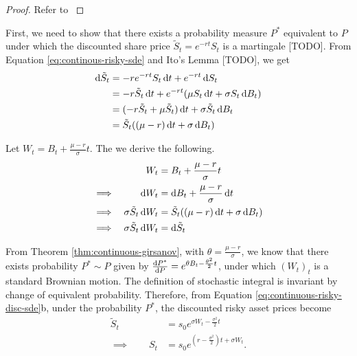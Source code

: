 \begin{proof}
	Refer to \cite[Theorem 4.2.2 and Chapter 4: Exercise 19]{Lamberton1996}
\end{proof}


First, we need to show that there exists a probability measure $ P^* $ equivalent to $ P $ under which the discounted share price $ \tilde{S}_t = e^{-rt} S_t $ is a martingale [TODO]. From Equation \ref{eq:continous-risky-sde} and Ito's Lemma [TODO], we get
\begin{align*}
	\dif \tilde{S}_t  &=  -r e^{-rt} S_t \dif t + e^{-rt} \dif S_t  \\
	&=  -r \tilde{S}_t \dif t + e^{-rt} ( \mu S_t \dif t + \sigma S_t \dif B_t )  \\
	&=  (-r \tilde{S}_t + \mu \tilde{S}_t) \dif t + \sigma \tilde{S}_t \dif B_t  \\
	&=  \tilde{S}_t ( (\mu - r) \dif t + \sigma \dif B_t )
\end{align*}

Let $ W_t = B_t + \frac{\mu - r}{\sigma} t $. The we derive the following.
\begin{subequations}
	\label{eq:continuous-risky-disc-sde}
	\begin{align}
		&&  W_t  &=  B_t + \frac{\mu - r}{\sigma} t  \\
		\implies  &&  \dif W_t  &=  \dif B_t + \frac{\mu - r}{\sigma} \dif t  \nonumber \\
		\implies  &&  \sigma \tilde{S}_t \dif W_t  &=  \tilde{S}_t ( (\mu - r) \dif t + \sigma \dif B_t )  \nonumber \\
		\implies  &&  \sigma \tilde{S}_t \dif W_t  &=  \dif \tilde{S}_t
	\end{align}
\end{subequations}

From Theorem \ref{thm:continuous-girsanov}, with $ \theta = \frac{\mu - r}{\sigma} $, we know that there exists probability $ P^* \sim P $ given by $ \frac{\dif P^*}{\dif P} = e^{ \theta B_t - \frac{\theta^2}{2} t } $,
under which $ (W_t)_t $ is a standard Brownian motion. The definition of stochastic integral is invariant by change of equivalent probability. Therefore, from Equation \ref{eq:continuous-risky-disc-sde}b, under the probability $ P^* $, the discounted risky asset prices become
\begin{subequations}
	\begin{align}
		\label{eq:continous-risky}
		\tilde{S}_t  &=  s_0 e^{\sigma W_t - \frac{\sigma^2}{2} t }  \\
		\implies  \qquad  S_t  &=  s_0 e^{ ( r - \frac{\sigma^2}{2} ) t + \sigma W_t }.
	\end{align}	
\end{subequations}

